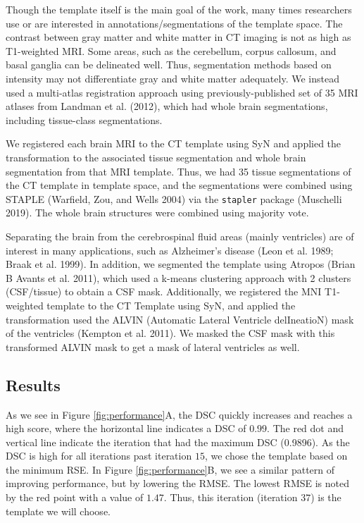 \documentclass[]{elsarticle} %
\begin{document}
Though the template itself is the main goal of the work, many times researchers use or are interested in annotations/segmentations of the template space. The contrast between gray matter and white matter in CT imaging is not as high as T1-weighted MRI. Some areas, such as the cerebellum, corpus callosum, and basal ganglia can be delineated well. Thus, segmentation methods based on intensity may not differentiate gray and white matter adequately. We instead used a multi-atlas registration approach using previously-published set of 35 MRI atlases from Landman et al. (2012), which had whole brain segmentations, including tissue-class segmentations.

We registered each brain MRI to the CT template using SyN and applied the transformation to the associated tissue segmentation and whole brain segmentation from that MRI template. Thus, we had 35 tissue segmentations of the CT template in template space, and the segmentations were combined using STAPLE (Warfield, Zou, and Wells 2004) via the \texttt{stapler} package (Muschelli 2019). The whole brain structures were combined using majority vote.

Separating the brain from the cerebrospinal fluid areas (mainly ventricles) are of interest in many applications, such as Alzheimer's disease (Leon et al. 1989; Braak et al. 1999). In addition, we segmented the template using Atropos (Brian B Avants et al. 2011), which used a k-means clustering approach with 2 clusters (CSF/tissue) to obtain a CSF mask. Additionally, we registered the MNI T1-weighted template to the CT Template using SyN, and applied the transformation used the ALVIN (Automatic Lateral Ventricle delIneatioN) mask of the ventricles (Kempton et al. 2011). We masked the CSF mask with this transformed ALVIN mask to get a mask of lateral ventricles as well.

\hypertarget{results}{%
\subsection{Results}\label{results}}

As we see in Figure \ref{fig:performance}A, the DSC quickly increases and reaches a high score, where the horizontal line indicates a DSC of \(0.99\). The red dot and vertical line indicate the iteration that had the maximum DSC (0.9896). As the DSC is high for all iterations past iteration \(15\), we chose the template based on the minimum RSE. In Figure \ref{fig:performance}B, we see a similar pattern of improving performance, but by lowering the RMSE. The lowest RMSE is noted by the red point with a value of \(1.47\). Thus, this iteration (iteration \(37\)) is the template we will choose.
\end{document}

